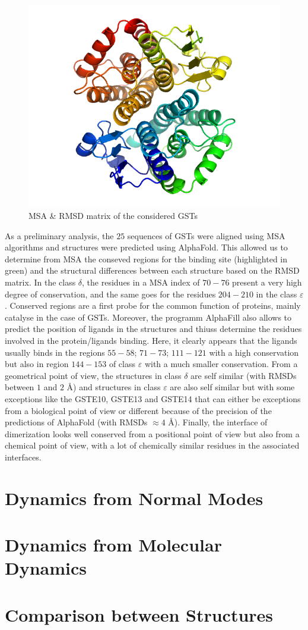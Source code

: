 \begin{figure}[h!]
\begin{minipage}{.32\linewidth}
		\includegraphics[width = .99\textwidth]{figures/fig3-1-4} %
	\end{minipage}
	\caption{MSA \& RMSD matrix of the considered GSTs}
\end{figure}
\noindent As a preliminary analysis, the $25$ sequences of GSTs were aligned using MSA algorithms and structures were predicted using AlphaFold. This allowed us to determine from MSA the conseved regions for the binding site (highlighted in green) and the structural differences between each structure based on the RMSD matrix. In the class $\delta$, the residues in a MSA index of $70-76$ present a very high degree of conservation, and the same goes for the residues $204-210$ in the class $\varepsilon$. Conserved regions are a first probe for the common function of proteins, mainly catalyse in the case of GSTs. Moreover, the programm AlphaFill also allows to predict the position of ligands in the structures and thiuss determine the residues involved in the protein/ligands binding. Here, it clearly appears that the ligands usually binds in the regions $55-58$; $71-73$; $111-121$ with a high conservation but also in region $144-153$ of class $\varepsilon$ with a much smaller conservation. From a geometrical point of view, the structures in class $\delta$ are self similar (with RMSDs between $1$ and $2$ \AA) and structures in class $\varepsilon$ are also self similar but with some exceptions like the GSTE10, GSTE13 and GSTE14 that can either be exceptions from a biological point of view or different because of the precision of the predictions of AlphaFold (with RMSDs $\approx 4$ \AA). Finally, the interface of dimerization looks well conserved from a positional point of view but also from a chemical point of view, with a lot of chemically similar residues in the associated interfaces.   
\section{Dynamics from Normal Modes}

\section{Dynamics from Molecular Dynamics}

\section{Comparison between Structures}